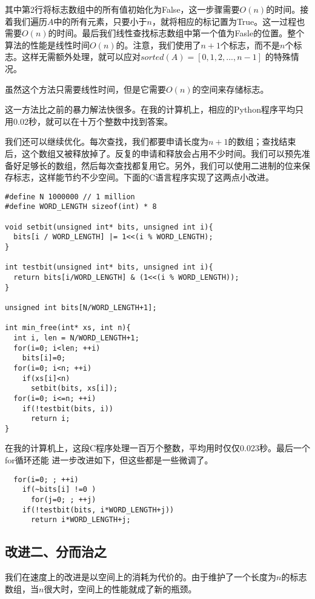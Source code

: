 \documentclass[UTF8]{article}
\begin{document}
其中第2行将标志数组中的所有值初始化为False，这一步骤需要$O(n)$的时间。接着我们遍历$A$中的所有元素，只要小于$n$，就将相应的标记置为True。这一过程也需要$O(n)$的时间。最后我们线性查找标志数组中第一个值为Fasle的位置。整个算法的性能是线性时间$O(n)$的。注意，我们使用了$n+1$个标志，而不是$n$个标志。这样无需额外处理，就可以应对$sorted(A) = [0, 1, 2, ..., n-1]$
的特殊情况。

虽然这个方法只需要线性时间，但是它需要$O(n)$的空间来存储标志。

这一方法比之前的暴力解法快很多。在我的计算机上，相应的Python程序平均只用0.02秒，就可以在十万个整数中找到答案。

我们还可以继续优化。每次查找，我们都要申请长度为$n+1$的数组；查找结束后，这个数组又被释放掉了。反复的申请和释放会占用不少时间。我们可以预先准备好足够长的数组，然后每次查找都复用它。另外，我们可以使用二进制的位来保存标志，这样能节约不少空间。下面的C语言程序实现了这两点小改进。

\lstset{language = C}
\begin{lstlisting}
#define N 1000000 // 1 million
#define WORD_LENGTH sizeof(int) * 8

void setbit(unsigned int* bits, unsigned int i){
  bits[i / WORD_LENGTH] |= 1<<(i % WORD_LENGTH);
}

int testbit(unsigned int* bits, unsigned int i){
  return bits[i/WORD_LENGTH] & (1<<(i % WORD_LENGTH));
}

unsigned int bits[N/WORD_LENGTH+1];

int min_free(int* xs, int n){
  int i, len = N/WORD_LENGTH+1;
  for(i=0; i<len; ++i)
    bits[i]=0;
  for(i=0; i<n; ++i)
    if(xs[i]<n)
      setbit(bits, xs[i]);
  for(i=0; i<=n; ++i)
    if(!testbit(bits, i))
      return i;
}
\end{lstlisting}

在我的计算机上，这段C程序处理一百万个整数，平均用时仅仅0.023秒。最后一个for循环还能
进一步改进如下，但这些都是一些微调了。

\begin{lstlisting}
  for(i=0; ; ++i)
    if(~bits[i] !=0 )
      for(j=0; ; ++j)
	if(!testbit(bits, i*WORD_LENGTH+j))
	  return i*WORD_LENGTH+j;
\end{lstlisting}

\subsection{改进二、分而治之}
我们在速度上的改进是以空间上的消耗为代价的。由于维护了一个长度为$n$的标志数组，当$n$很大时，空间上的性能就成了新的瓶颈。
\end{document}

